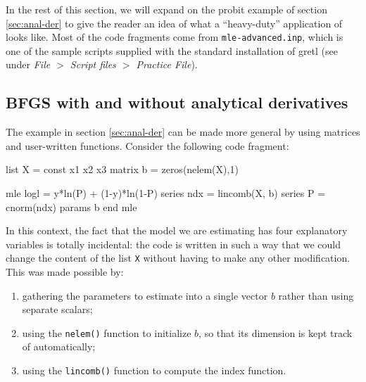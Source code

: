 In the rest of this section, we will expand on the probit example of
section \ref{sec:anal-der} to give the reader an idea of what a
``heavy-duty'' application of  looks like. Most of the code
fragments come from \verb|mle-advanced.inp|, which is one of the
sample scripts supplied with the standard installation of gretl
(see under \emph{File $>$ Script files $>$ Practice File}).

\subsection{BFGS with and without analytical derivatives}
\label{sec:mle-adv-bfgs}

The example in section \ref{sec:anal-der} can be made more general by
using matrices and user-written functions. Consider the following code
fragment:
\begin{code}
list X = const x1 x2 x3
matrix b = zeros(nelem(X),1)

mle logl = y*ln(P) + (1-y)*ln(1-P)
    series ndx = lincomb(X, b)
    series P = cnorm(ndx)
    params b
end mle
\end{code}

In this context, the fact that the model we are estimating has four
explanatory variables is totally incidental: the code is written in
such a way that we could change the content of the list \texttt{X}
without having to make any other modification. This was made possible
by:
\begin{enumerate}
\item gathering the parameters to estimate into a single vector $b$
  rather than using separate scalars;
\item using the \texttt{nelem()} function to initialize $b$, so that
  its dimension is kept track of automatically;
\item using the \texttt{lincomb()} function to compute the index
  function.
\end{enumerate}

